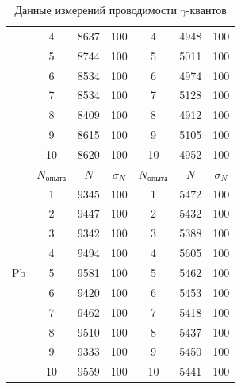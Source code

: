 \documentclass[a4paper, 12pt]{article}%
\begin{document}
\begin{table}[h]
\begin{center}
\begin{tabular}{|c|c|c|c|c|c|c|}
                     & 4                  & 8637  & 100        & 4                  & 4948  & 100        \\ \cline{2-7} 
                     & 5                  & 8744  & 100        & 5                  & 5011  & 100        \\ \cline{2-7} 
                     & 6                  & 8534  & 100        & 6                  & 4974  & 100        \\ \cline{2-7} 
                     & 7                  & 8534  & 100        & 7                  & 5128  & 100        \\ \cline{2-7} 
                     & 8                  & 8409  & 100        & 8                  & 4912  & 100        \\ \cline{2-7} 
                     & 9                  & 8615  & 100        & 9                  & 5105  & 100        \\ \cline{2-7} 
                     & 10                 & 8620  & 100        & 10                 & 4952  & 100        \\ \hline
\multirow{11}{*}{Pb} & $N_{\text{опыта}}$ & $N$   & $\sigma_N$ & $N_{\text{опыта}}$ & $N$   & $\sigma_N$ \\ \cline{2-7} 
                     & 1                  & 9345  & 100        & 1                  & 5472  & 100        \\ \cline{2-7} 
                     & 2                  & 9447  & 100        & 2                  & 5432  & 100        \\ \cline{2-7} 
                     & 3                  & 9342  & 100        & 3                  & 5388  & 100        \\ \cline{2-7} 
                     & 4                  & 9494  & 100        & 4                  & 5605  & 100        \\ \cline{2-7} 
                     & 5                  & 9581  & 100        & 5                  & 5462  & 100        \\ \cline{2-7} 
                     & 6                  & 9420  & 100        & 6                  & 5453  & 100        \\ \cline{2-7} 
                     & 7                  & 9462  & 100        & 7                  & 5418  & 100        \\ \cline{2-7} 
                     & 8                  & 9510  & 100        & 8                  & 5437  & 100        \\ \cline{2-7} 
                     & 9                  & 9333  & 100        & 9                  & 5450  & 100        \\ \cline{2-7} 
                     & 10                 & 9559  & 100        & 10                 & 5441  & 100        \\ \hline
\end{tabular}
\caption{Данные измерений проводимости $\gamma$-квантов}
\end{center}
\end{table}
\end{document}
